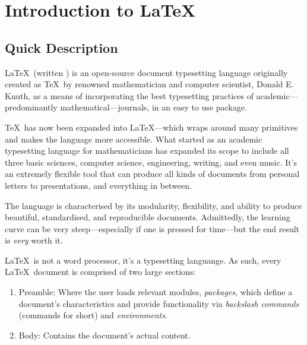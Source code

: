 \chapter{Introduction to \LaTeX}
%
\section{Quick Description}\label{s:qd}
\LaTeX~(written ) is an open-source document typesetting
language originally created as \TeX~by renowned mathematician and
computer scientist, Donald E. Knuth, as a means of incorporating the
best typesetting practices of academic---predominantly
mathematical---journals, in an easy to use package.

\TeX~has now been expanded into \LaTeX---which wraps around many
primitives and makes the language more accessible. What started as an
academic typesetting language for mathematicians has expanded its
scope to include all three basic sciences, computer science,
engineering, writing, and even music.  It's an extremely flexible tool
that can produce all kinds of documents from personal letters to
 presentations, and everything in between.

The language is characterised by its modularity, flexibility, and
ability to produce beautiful, standardised, and reproducible
documents.  Admittedly, the learning curve can be very
steep---especially if one is pressed for time---but the end result is
\emph{very} worth it.

\LaTeX~is not a word processor, it's a typesetting languange.  As
such, every \LaTeX~document is comprised of two large sections:
\begin{enumerate}
\item Preamble: Where the user loads relevant modules,
  \emph{packages}, which define a document's characteristics and
  provide functionality via \emph{backslash commands} (commands for
  short) and \emph{environments}.
\item Body: Contains the document's actual content.
\end{enumerate}
%
